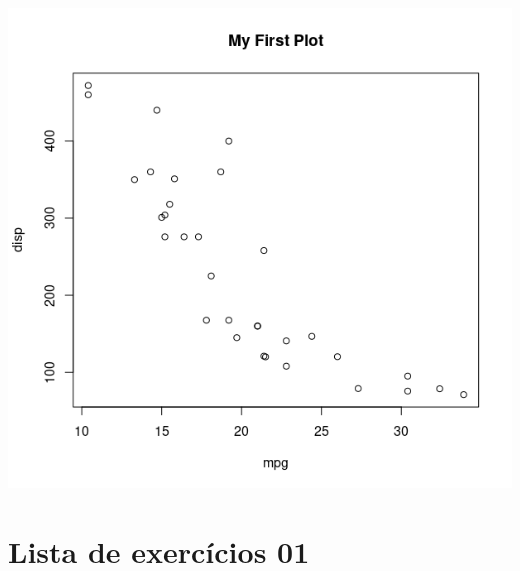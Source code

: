 \documentclass[
]{book}
\begin{document}
\includegraphics{figure/g11.png}

\hypertarget{lista-de-exercuxedcios-01}{%
\section{Lista de exercícios 01}\label{lista-de-exercuxedcios-01}}
\end{document}
